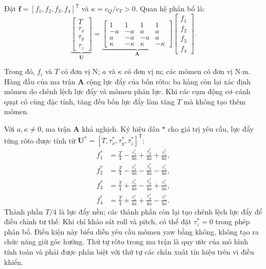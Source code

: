 \begin{samepage}
	Đặt $\mathbf f=[f_1,f_2,f_3,f_4]^{\mathsf T}$ và $\kappa=c_Q/c_T>0$. Quan hệ phân bổ là:
	\begin{equation}
		\underbrace{\begin{bmatrix}T\\\tau_x\\\tau_y\\\tau_z\end{bmatrix}}_{\mathbf U}
		=\underbrace{\begin{bmatrix}
				1      & 1       & 1      & 1       \\
				-a     & -a      & a      & a       \\
				a      & -a      & -a     & a       \\
				\kappa & -\kappa & \kappa & -\kappa
			\end{bmatrix}}_{\mathbf A}
		\begin{bmatrix}f_1\\f_2\\f_3\\f_4\end{bmatrix}.
		\label{eq:background-allocation-matrix}
	\end{equation}
\end{samepage}
Trong đó, $f_i$ và $T$ có đơn vị N; $a$ và $\kappa$ có đơn vị m; các mômen có đơn vị N$\cdot$m. Hàng đầu của ma trận $\mathbf A$ cộng lực đẩy của bốn rôto; ba hàng còn lại xác định mômen do chênh lệch lực đẩy và mômen phản lực. Khi các cụm động cơ--cánh quạt có cùng đặc tính, tăng đều bốn lực đẩy làm tăng $T$ mà không tạo thêm mômen.

Với $a,\kappa\ne0$, ma trận $\mathbf A$ khả nghịch. Ký hiệu dấu $*$ cho giá trị yêu cầu, lực đẩy từng rôto được tính từ $\mathbf U^*=[T,\tau_x^*,\tau_y^*,\tau_z^*]^{\mathsf T}$:
\begin{equation}
	\begin{aligned}
		f_1^* & =\frac T4-\frac{\tau_x^*}{4a}+\frac{\tau_y^*}{4a}
		+\frac{\tau_z^*}{4\kappa},                                \\
		f_2^* & =\frac T4-\frac{\tau_x^*}{4a}-\frac{\tau_y^*}{4a}
		-\frac{\tau_z^*}{4\kappa},                                \\
		f_3^* & =\frac T4+\frac{\tau_x^*}{4a}-\frac{\tau_y^*}{4a}
		+\frac{\tau_z^*}{4\kappa},                                \\
		f_4^* & =\frac T4+\frac{\tau_x^*}{4a}+\frac{\tau_y^*}{4a}
		-\frac{\tau_z^*}{4\kappa}.
	\end{aligned}
	\label{eq:background-inverse-allocation}
\end{equation}
Thành phần $T/4$ là lực đẩy nền; các thành phần còn lại tạo chênh lệch lực đẩy để điều chỉnh tư thế. Khi chỉ khảo sát roll và pitch, có thể đặt $\tau_z^*=0$ trong phép phân bổ. Điều kiện này biểu diễn yêu cầu mômen yaw bằng không, không tạo ra chức năng giữ góc hướng. Thứ tự rôto trong ma trận là quy ước của mô hình tính toán và phải được phân biệt với thứ tự các chân xuất tín hiệu trên vi điều khiển.

